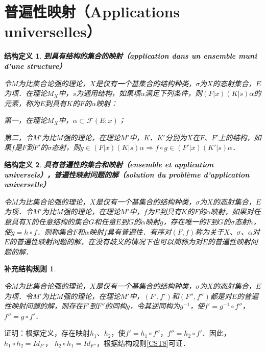 \documentclass[12pt, a4paper, oneside]{book}
\newtheorem{STdef}{结构定义}
\newtheorem{CSTcor}{补充结构规则}
\begin{document}
		\section{普遍性映射（Applications universelles）}		
			\begin{STdef}
				\textbf{到具有结构的集合的映射（application dans un ensemble muni d'une structure）}
				\par
				令$M$为比集合论强的理论，$X$是仅有一个基集合的结构种类，$\sigma$为$X$的态射集合，$E$为项．在理论$M_X$中，$s$为通用结构，如果项$\alpha$满足下列条件，则$(F|x)(K|s)\alpha$的元素，称为$E$到具有$K$的$F$的$\alpha$映射：
				\par
				第一，在理论$M_X$中，$\alpha\subset \mathcal{F}(E; x)$；
				\par
				第二，令$M'$为比$M$强的理论，在理论$M'$中，$K$、$K'$分别为$X$在$F$、$F'$上的结构，如果$f$是$F$到$F'$的$\sigma$态射，则$g\in (F|x)(K|s)\alpha\Rightarrow f\circ g\in (F'|x)(K'|s)\alpha$．
			\end{STdef}
			
			\begin{STdef}
				\textbf{具有普遍性的集合和映射（ensemble et application universels），普遍性映射问题的解（solution du problème d'application universelle）}
				\par
				令$M$为比集合论强的理论，$X$是仅有一个基集合的结构种类，$\sigma$为$X$的态射集合，$E$为项．令$M'$为比$M$强的理论，在理论$M'$中，$f$为$E$到具有$K$的$F$的$\alpha$映射，如果对任意具有$X$的任意结构的集合$G$和任意$E$到$G$的$\alpha$映射$g$，存在唯一的$F$到$G$的$\sigma$态射$h$，使$g=h\circ f$．则称集合$F$和$\alpha$映射$f$具有普遍性．有序对$(F, f)$称为关于$X$、$\sigma$、$\alpha$对$E$的普遍性映射问题的解，在没有歧义的情况下也可以简称为对$E$的普遍性映射问题的解．
			\end{STdef}
			
			\begin{CSTcor}\label{CSTcor14}
				\hfill\par
				令$M$为比集合论强的理论，$X$是仅有一个基集合的结构种类，$\sigma$为$X$的态射集合，$E$为项．令$M'$为比$M$强的理论，在理论$M'$中，$(F', f')$和$(F'', f'')$都是对$E$的普遍性映射问题的解，则存在$F'$到$F''$的同构$g$，令其逆同构为$g^{-1}$，使$f'=g^{-1}\circ f''$，$f''=g\circ f'$．
			\end{CSTcor}
			证明：根据定义，存在映射$h_1$、$h_2$，使$f'= h_1\circ f''$，$f''= h_2\circ f'$．因此，$h_1\circ h_2=Id_{F'}$， $h_2\circ h_1=Id_{F''}$，根据结构规则\ref{CST8}可证．
			
\end{document}
